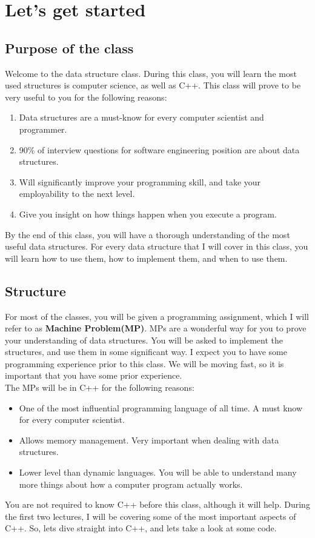 \documentclass[../notebook.tex]{subfiles}
\begin{document}
\begin{center}

\end{center}

\section{ Let's get started }
\subsection{Purpose of the class} %
\label{sec:Purpose of the class}
Welcome to the data structure class. During this class, you will learn the most used structures is computer science, as well as C++. This class will prove to be very useful to you for the following reasons:
\begin{enumerate}
  \item Data structures are a must-know for every computer scientist and programmer.
  \item 90\% of interview questions for software engineering position are about data structures.
  \item Will significantly improve your programming skill, and take your employability to the next level.
  \item Give you insight on how things happen when you execute a program.
\end{enumerate}
By the end of this class, you will have a thorough understanding of the most useful data structures. For every data structure that I will cover in this class, you will learn how to use them, how to implement them, and when to use them. \\
\subsection{Structure} %
\label{sec:Structure}
For most of the classes, you will be given a programming assignment, which I will refer to as {\bf Machine Problem(MP)}. MPs are a wonderful way for you to prove your understanding of data structures. You will be asked to implement the structures, and use them in some significant way. I expect you to have some programming experience prior to this class. We will be moving fast, so it is important that you have some prior experience. \\
The MPs will be in C++ for the following reasons:
\begin{itemize}
  \item One of the most influential programming language of all time. A must know for every computer scientist.
  \item Allows memory management. Very important when dealing with data structures.
  \item Lower level than dynamic languages. You will be able to understand many more things about how a computer program actually works.
\end{itemize}
You are not required to know C++ before this class, although it will help. During the first two lectures, I will be covering some of the most important aspects of C++. So, lets dive straight into C++, and lets take a look at some code.
\end{document}
